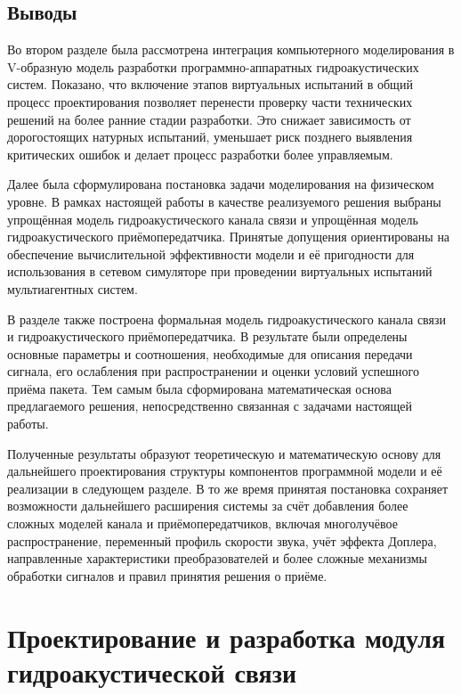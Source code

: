 \documentclass[
    numbers=section,
    document-code={ВКРБ--09.03.04--10.19--XX--26--81}
]{../latex/fqw}
\begin{document}
    \subsection*{Выводы}\label{subsec:conclusions_of_chapter_2}

    Во втором разделе была рассмотрена интеграция компьютерного моделирования в
    V-образную модель разработки программно-аппаратных гидроакустических систем.
    Показано, что включение этапов виртуальных испытаний в общий процесс проектирования
    позволяет перенести проверку части технических решений на более ранние стадии разработки.
    Это снижает зависимость от дорогостоящих натурных испытаний,
    уменьшает риск позднего выявления критических ошибок и
    делает процесс разработки более управляемым.

    Далее была сформулирована постановка задачи моделирования на физическом уровне.
    В рамках настоящей работы в качестве реализуемого решения выбраны упрощённая модель гидроакустического канала связи
    и упрощённая модель гидроакустического приёмопередатчика.
    Принятые допущения ориентированы на обеспечение вычислительной эффективности модели и
    её пригодности для использования в сетевом симуляторе при проведении виртуальных испытаний мультиагентных систем.

    В разделе также построена формальная модель
    гидроакустического канала связи и
    гидроакустического приёмопередатчика.
    В результате были определены основные параметры и соотношения, необходимые для описания передачи сигнала,
    его ослабления при распространении и оценки условий успешного приёма пакета.
    Тем самым была сформирована математическая основа предлагаемого решения,
    непосредственно связанная с задачами настоящей работы.

    Полученные результаты образуют теоретическую и математическую основу
    для дальнейшего проектирования структуры компонентов программной модели и её
    реализации в следующем разделе.
    В то же время принятая постановка сохраняет возможности дальнейшего расширения системы
    за счёт добавления более сложных моделей канала и приёмопередатчиков,
    включая многолучёвое распространение,
    переменный профиль скорости звука,
    учёт эффекта Доплера,
    направленные характеристики преобразователей и
    более сложные механизмы обработки сигналов и
    правил принятия решения о приёме.


    \section{Проектирование и разработка модуля гидроакустической связи}\label{sec:module_design}
\end{document}
